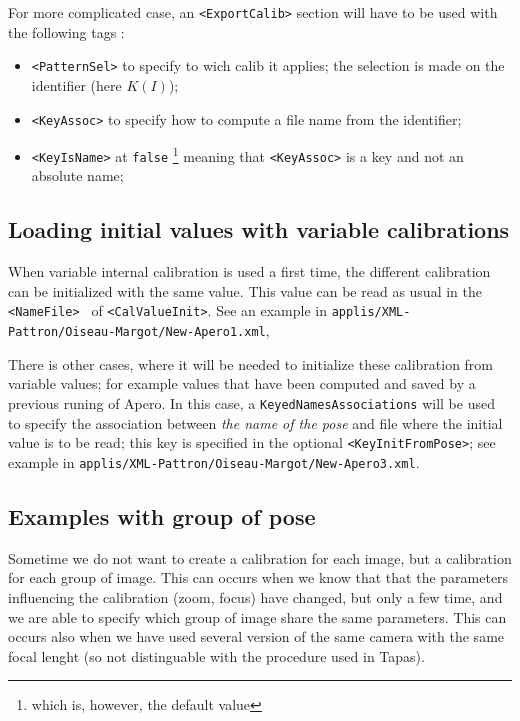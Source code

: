 For more complicated case,  an {\tt <ExportCalib>} section  will have to be
used with the following tags :

\begin{itemize}
    \item {\tt <PatternSel>}  to specify to wich calib it applies; the selection
         is made on the identifier (here $K(I)$);

    \item {\tt <KeyAssoc>}  to specify how to compute a file name from the identifier;

    \item {\tt <KeyIsName>}  at {\tt false} \footnote{which is, however, the default value} meaning
          that {\tt <KeyAssoc>}  is a key and not an absolute name;
\end{itemize}


\subsection{Loading initial values  with  variable calibrations}

When  variable internal calibration is used a first time,
the different calibration can be initialized with the same
value.  This value can be read as usual in the {\tt <NameFile> } of {\tt <CalValueInit>}.
See an example in {\tt  applis/XML-Pattron/Oiseau-Margot/New-Apero1.xml},

There is other cases, where it will be needed to initialize these  calibration
from variable values; for example values  that have been computed and saved by a
previous runing of Apero. In this case, a {\tt KeyedNamesAssociations} will be used
to specify the association between \emph{the  name of the pose} and file where
the initial value is to be read; this key is specified in the optional
{\tt <KeyInitFromPose>}; see example in {\tt  applis/XML-Pattron/Oiseau-Margot/New-Apero3.xml}.


\subsection{Examples with group of pose}

Sometime we do not want to create a calibration for each image,
but a calibration for each group of image. This can occurs
when we know that that the parameters influencing the calibration
(zoom, focus) have changed, but only a few time, and we are able
to specify which group of image share the same parameters.
This can occurs also when we have used several version of the
same camera with the same focal lenght (so not distinguable
with the procedure used in Tapas).

